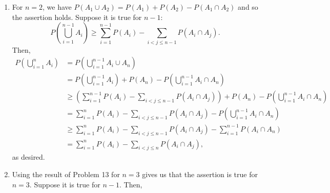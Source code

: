 \begin{solution}
   \begin{enumerate}
        \item For $n = 2$, we have $P(A_1 \cup A_2) = P(A_1) + P(A_2) - P(A_1 \cap A_2)$ and so the assertion holds. Suppose it is true for $n - 1$:    
        \[ P\left(\bigcup_{i = 1}^{n - 1} A_i\right) \geq \sum_{i = 1}^{n - 1} P(A_i) - \sum_{i < j \leq n - 1} P(A_i \cap A_j). \]
        Then, 
        \begin{align*}
            P \left( \bigcup_{i = 1}^n A_i \right) &= P \left( \bigcup_{i = 1}^{n - 1} A_i \cup A_n \right) \\
            &= P \left( \bigcup_{i = 1}^{n - 1} A_i \right) + P(A_n) - P \left( \bigcup_{i = 1}^{n - 1} A_i \cap A_n \right) \\
            &\geq \left( \sum_{i = 1}^{n - 1} P(A_i) - \sum_{i < j \leq n - 1} P(A_i \cap A_j) \right) + P(A_n) - P \left( \bigcup_{i = 1}^{n - 1} A_i \cap A_n \right) \tag{by the inductive hypothesis} \\
            &= \sum_{i = 1}^n P(A_i) - \sum_{i < j \leq n - 1} P(A_i \cap A_j) - P \left( \bigcup_{i = 1}^{n - 1} A_i \cap A_n \right) \\
            &\geq \sum_{i = 1}^n P(A_i) - \sum_{i < j \leq n - 1} P(A_i \cap A_j) - \sum_{i = 1}^{n - 1} P(A_i \cap A_n) \tag{by subadditivity} \\
            &= \sum_{i = 1}^n P(A_i) - \sum_{i < j \leq n} P(A_i \cap A_j),
        \end{align*}
        as desired.

        \item Using the result of Problem 13 for $n = 3$ gives us that the assertion is true for $n = 3$. Suppose it is true for $n - 1$. Then,     
           

\end{enumerate}
\end{solution}
